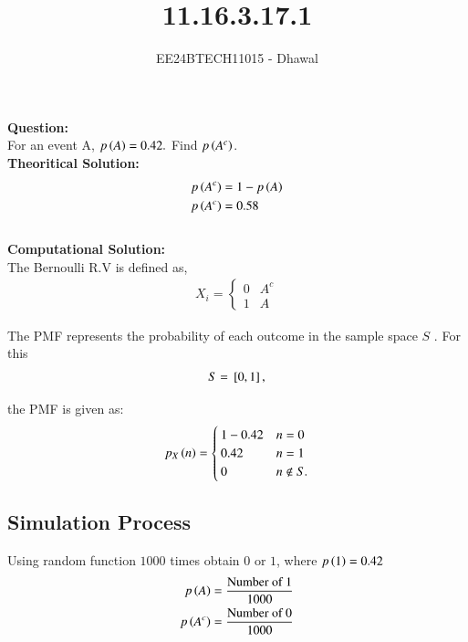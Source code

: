 \documentclass[journal]{IEEEtran}
\begin{document}

\vspace{3cm}

\title{11.16.3.17.1}
\author{EE24BTECH11015 - Dhawal}

{\let\newpage\relax\maketitle}

\renewcommand{\thefigure}{\theenumi}
\renewcommand{\thetable}{\theenumi}
\setlength{\intextsep}{10pt} %

\textbf{Question:}\\
For an event A, $p\left(A\right)=0.42.$ Find $p\left(A^c\right)$.\\
	
	\textbf{Theoritical Solution:}
	\begin{align}
		p\left(A^c\right)&=1-p\left(A\right)\\
        p\left(A^c\right)&=0.58
	\end{align}\\
	\textbf{Computational Solution:}\\
	The Bernoulli R.V is defined as,
\begin{align}
	X_i = \begin{cases}
		0 & A^c\\	
		1 & A	
	\end{cases}
\end{align}

    The PMF represents the probability of each outcome in the sample space $S$ . For this
\begin{align*}
    S = {}\left[0, 1\right],
\end{align*}

the PMF is given as:
\begin{align}
p_X\left(n\right) = \begin{cases}
    1-0.42 & n = 0\\
    0.42 & n = 1 \\ 
    0 & n \notin S.
\end{cases}
\end{align}

\subsection*{Simulation Process}
Using random function $1000$ times obtain $0$ or $1$, where $p\left(1\right)=0.42$ 
\begin{align}
    p\left(A\right)=\frac{\text{Number of 1}}{1000}\\
        p\left(A^c\right)=\frac{\text{Number of 0}}{1000}
\end{align}
\end{document}
